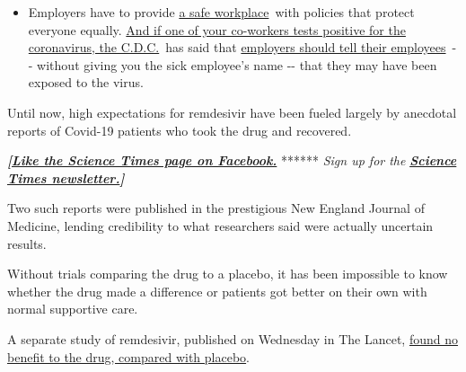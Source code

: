 \begin{itemize}
  \begin{itemize}
  \tightlist
  \item
    Employers have to provide
    \href{https://www.osha.gov/SLTC/covid-19/standards.html}{a safe
    workplace}~with policies that protect everyone equally.
    \href{https://www.nytimes3xbfgragh.onion/article/coronavirus-money-unemployment.html?action=click\&pgtype=Article\&state=default\&region=MAIN_CONTENT_3\&context=storylines_faq}{And
    if one of your co-workers tests positive for the coronavirus, the
    C.D.C.}~has said that
    \href{https://www.cdc.gov/coronavirus/2019-ncov/community/guidance-business-response.html}{employers
    should tell their employees}~-\/- without giving you the sick
    employee's name -\/- that they may have been exposed to the virus.
  \end{itemize}
\end{itemize}

Until now, high expectations for remdesivir have been fueled largely by
anecdotal reports of Covid-19 patients who took the drug and recovered.

\textbf{\emph{{[}}\href{http://on.fb.me/1paTQ1h}{\emph{Like the Science
Times page on Facebook.}}} ****** \emph{\textbar{} Sign up for the}
\textbf{\href{http://nyti.ms/1MbHaRU}{\emph{Science Times
newsletter.}}\emph{{]}}}

Two such reports were published in the prestigious New England Journal
of Medicine, lending credibility to what researchers said were actually
uncertain results.

Without trials comparing the drug to a placebo, it has been impossible
to know whether the drug made a difference or patients got better on
their own with normal supportive care.

A separate study of remdesivir, published on Wednesday in The Lancet,
\href{https://info.thelancet.com/e2t/c/*W5Lhn838fnW_3W4sm_Wg5QQHzp0/*W5r1Ssg7F8LYhW2vgqZF25s9wN0/5/f18dQhb0Sq5G8XYcl9W7cBCZh2qwv15N4cqMnwqd32pMf5gd4XD6prW7cmS1s8pCQ6vW1mbWlS51fy5BW1mZkg96PZgJcW6253v925_ybHN1fkGplKzm2PN5nYjTX6nKnZVtMd0d4gt1GhW7vVV9F1XJ6fhW57jZ6S8_1Q19W49wcLf2LRNVfW4bJ02h4b_rKwW7MbC3t490HkzVWnFLM4LzjSNW7-XB_567h1CPW8r5GVd2GRw4YW3HtrQn2K4XMjW8tzC3F8q-1tCN1KHWqCRFkK4W5G18Kh3y9KYQW3dgtM73TW-bPW44SfhK8LmYtqW61pGpf2Z_1FDN2_yx0RMHdTrVVyvfc3T_7nPW13211g8zzbM9W8LQbGP8k1lZBW8bCgv05CG9_9W8p-_Z43XZzCFW8fHR_k10p3ZcW8bJghY43Rx5xW17pGy38dQmZsW6wydXJ392FRmW4YxKrk4PxC8jW448k6V2YN1mWW3BYbdm3sfwJ-W41Tj081CSMcvW8mhVQY5GJkvkW1TxRJq25y1NZW65rp9c82Z63tW7m73CJ8rdTqcW7C2cLb7D7HxjW1Dy_KC77gPCSf3S9Pl404}{found
no benefit to the drug, compared with placebo}.

